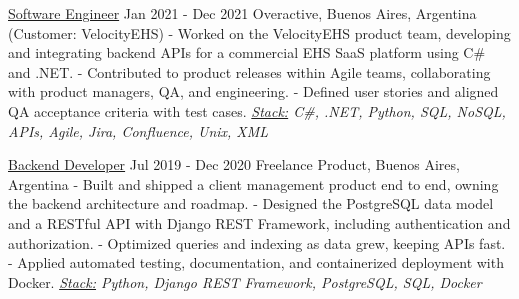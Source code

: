 \documentclass[a4paper]{ThirtyNinesecondscv}
\begin{document}
\begin{minipage}{\linewidth}
{\large\underline{Software Engineer}}  \hspace*{22pt} Jan 2021 - Dec 2021
\newline
Overactive, Buenos Aires, Argentina (Customer: VelocityEHS)
\newline- Worked on the VelocityEHS product team, developing and integrating backend APIs for a commercial EHS SaaS platform using C\# and .NET.
\newline- Contributed to product releases within Agile teams, collaborating with product managers, QA, and engineering.
\newline- Defined user stories and aligned QA acceptance criteria with test cases.
\newline\textit{\underline{Stack:} C\#, .NET, Python, SQL, NoSQL, APIs, Agile, Jira, Confluence, Unix, XML}
\end{minipage}
\par\vspace{6pt}

\begin{minipage}{\linewidth}
{\large\underline{Backend Developer}}  \hspace*{22pt} Jul 2019 - Dec 2020
\newline
Freelance Product, Buenos Aires, Argentina
\newline- Built and shipped a client management product end to end, owning the backend architecture and roadmap.
\newline- Designed the PostgreSQL data model and a RESTful API with Django REST Framework, including authentication and authorization.
\newline- Optimized queries and indexing as data grew, keeping APIs fast.
\newline- Applied automated testing, documentation, and containerized deployment with Docker.
\newline\textit{\underline{Stack:} Python, Django REST Framework, PostgreSQL, SQL, Docker}
\end{minipage}
\par\vspace{6pt}
\end{document}

